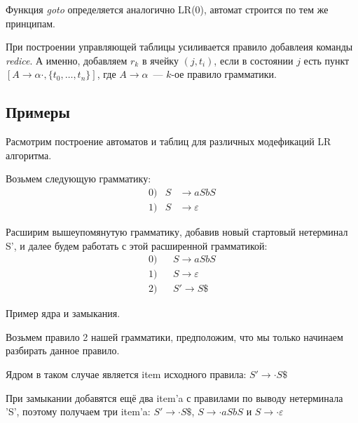 Функция \textit{goto} определяется аналогично LR(0), автомат строится по тем же принципам.

При построении управляющей таблицы усиливается правило добавлеия команды \textit{redice}.
А именно, добавляем $r_k$ в ячейку $(j,t_i)$, если в состоянии $j$ есть пункт $[A \to \alpha \cdot, \{t_0, \dots, t_n\}]$, где $A \to \alpha$~--- $k$-ое правило грамматики.

\subsection{Примеры}

Расмотрим построение автоматов и таблиц для различных модефикаций LR алгоритма.

Возьмем следующую грамматику:
\begin{align*}
0)&  S & \rightarrow a S b S \\
1)&  S & \rightarrow \varepsilon
\end{align*}

Расширим вышеупомянутую грамматику, добавив новый стартовый нетерминал S', и далее будем работать с этой расширенной грамматикой:
\begin{align*}
0)&  & S \rightarrow a S b S \\
1)&  & S \rightarrow \varepsilon \\
2)&  & S' \rightarrow S \$
\end{align*}


\begin{example}
Пример ядра и замыкания.

Возьмем правило 2 нашей грамматики, предположим, что мы только начинаем разбирать данное правило.

Ядром в таком случае является item исходного правила: $S' \rightarrow \cdot S \$$

При замыкании добавятся ещё два item'a с правилами по выводу нетерминала 'S', поэтому получаем три item'a: $S' \rightarrow \cdot S\$$, $S \rightarrow \cdot aSbS$ и $S \rightarrow \cdot \varepsilon$
\end{example}

